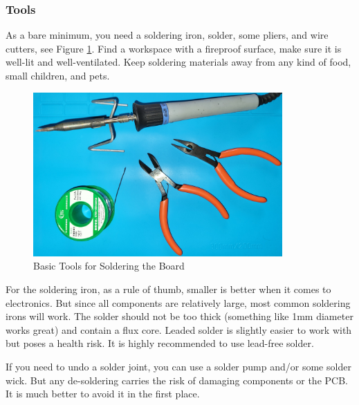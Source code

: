 \documentclass{article}
\begin{document}
\subsubsection{Tools}\label{sec:tools}
As a bare minimum, you need a soldering iron, solder, some pliers, and wire cutters, see Figure \ref{fig:solderingTools}.  Find a workspace with a fireproof surface, make sure it is well-lit and well-ventilated. Keep soldering materials away from any kind of food, small children, and pets. 
\begin{figure}[htb]
\centering
\includegraphics[width=0.85\textwidth]{Pictures/Tools.jpg}
\caption{Basic Tools for Soldering the Board}
\label{fig:solderingTools}
\end{figure}

For the soldering iron, as a rule of thumb, smaller is better when it comes to electronics. But since all components are relatively large, most common soldering irons will work. The solder should not be too thick (something like 1mm diameter works great) and contain a flux core. Leaded solder is slightly easier to work with but poses a health risk. It is highly recommended to use lead-free solder. 

If you need to undo a solder joint, you can use a solder pump and/or some solder wick. But any de-soldering carries the risk of damaging components or the PCB. It is much better to avoid it in the first place. 
\end{document}
